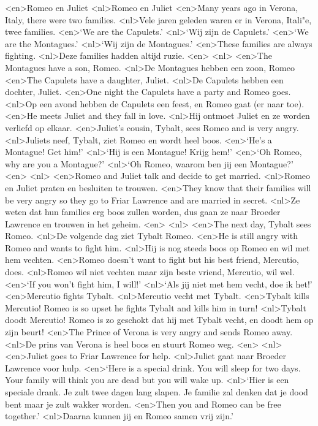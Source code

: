 <en>Romeo en Juliet
<nl>Romeo en Juliet
<en>Many years ago in Verona, Italy, there were two families.
<nl>Vele jaren geleden waren er in Verona, Itali"e, twee families.
<en>‘We are the Capulets.’
<nl>`Wij zijn de Capulets.'
<en>‘We are the Montagues.’
<nl>`Wij zijn de Montagues.'
<en>These families are always fighting. 
<nl>Deze families hadden altijd ruzie.
<en>
<nl>
<en>The Montagues have a son, Romeo. 
<nl>De Montagues hebben een zoon, Romeo
<en>The Capulets have a daughter, Juliet.
<nl>De Capulets hebben een dochter, Juliet.
<en>One night the Capulets have a party and Romeo goes. 
<nl>Op een avond hebben de Capulets een feest, en Romeo gaat (er naar toe).
<en>He meets Juliet and they fall in love. 
<nl>Hij ontmoet Juliet en ze worden verliefd op elkaar.
<en>Juliet’s cousin, Tybalt, sees Romeo and is very angry.
<nl>Juliets neef, Tybalt, ziet Romeo en wordt heel boos.
<en>‘He’s a Montague! Get him!’
<nl>`Hij is een Montague! Krijg hem!'
<en>‘Oh Romeo, why are you a Montague?’
<nl>`Oh Romeo, waarom ben jij een Montague?'
<en>
<nl>
<en>Romeo and Juliet talk and decide to get married.
<nl>Romeo en Juliet praten en besluiten te trouwen.
<en>They know that their families will be very angry so they go to Friar Lawrence and are married in secret.
<nl>Ze weten dat hun families erg boos zullen worden, dus gaan ze naar Broeder Lawrence en trouwen in het geheim.
<en>
<nl>
<en>The next day, Tybalt sees Romeo. 
<nl>De volgende dag ziet Tybalt Romeo.
<en>He is still angry with Romeo and wants to fight him.
<nl>Hij is nog steeds boos op Romeo en wil met hem vechten.
<en>Romeo doesn’t want to fight but his best friend, Mercutio, does.
<nl>Romeo wil niet vechten maar zijn beste vriend, Mercutio, wil wel.
<en>‘If you won’t fight him, I will!’
<nl>`Als jij niet met hem vecht, doe ik het!'
<en>Mercutio fights Tybalt. 
<nl>Mercutio vecht met Tybalt.
<en>Tybalt kills Mercutio! Romeo is so upset he fights Tybalt and kills him in turn!
<nl>Tybalt doodt Mercutio! Romeo is zo geschokt dat hij met Tybalt vecht, en doodt hem op zijn beurt!
<en>The Prince of Verona is very angry and sends Romeo away. 
<nl>De prins van Verona is heel boos en stuurt Romeo weg.
<en>
<nl>
<en>Juliet goes to Friar Lawrence for help.
<nl>Juliet gaat naar Broeder Lawrence voor hulp.
<en>‘Here is a special drink. You will sleep for two days. Your family will think you are dead but you will wake up. 
<nl>`Hier is een speciale drank. Je zult twee dagen lang slapen. Je familie zal denken dat je dood bent maar je zult wakker worden.
<en>Then you and Romeo can be free together.’
<nl>Daarna kunnen jij en Romeo samen vrij zijn.'
